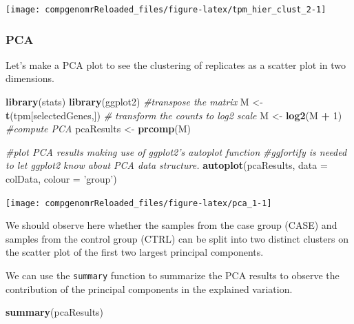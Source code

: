 \documentclass[12pt,]{krantz}
\newenvironment{Shaded}{\begin{snugshade}}{\end{snugshade}}
\newcommand{\CommentTok}[1]{\textcolor[rgb]{0.56,0.35,0.01}{\textit{#1}}}
\newcommand{\DataTypeTok}[1]{\textcolor[rgb]{0.13,0.29,0.53}{#1}}
\newcommand{\DecValTok}[1]{\textcolor[rgb]{0.00,0.00,0.81}{#1}}
\newcommand{\KeywordTok}[1]{\textcolor[rgb]{0.13,0.29,0.53}{\textbf{#1}}}
\newcommand{\NormalTok}[1]{#1}
\newcommand{\OperatorTok}[1]{\textcolor[rgb]{0.81,0.36,0.00}{\textbf{#1}}}
\newcommand{\StringTok}[1]{\textcolor[rgb]{0.31,0.60,0.02}{#1}}
\begin{document}
\begin{center}\texttt{[image: compgenomrReloaded\_files/figure-latex/tpm\_hier\_clust\_2-1]} \end{center}

\hypertarget{pca}{%
\subsubsection{PCA}\label{pca}}

Let's make a PCA plot to see the clustering of replicates as a scatter plot in two dimensions.

\begin{Shaded}
\begin{Highlighting}[]
\KeywordTok{library}\NormalTok{(stats)}
\KeywordTok{library}\NormalTok{(ggplot2)}
\CommentTok{#transpose the matrix }
\NormalTok{M <-}\StringTok{ }\KeywordTok{t}\NormalTok{(tpm[selectedGenes,])}
\CommentTok{# transform the counts to log2 scale }
\NormalTok{M <-}\StringTok{ }\KeywordTok{log2}\NormalTok{(M }\OperatorTok{+}\StringTok{ }\DecValTok{1}\NormalTok{)}
\CommentTok{#compute PCA }
\NormalTok{pcaResults <-}\StringTok{ }\KeywordTok{prcomp}\NormalTok{(M)}

\CommentTok{#plot PCA results making use of ggplot2's autoplot function}
\CommentTok{#ggfortify is needed to let ggplot2 know about PCA data structure. }
\KeywordTok{autoplot}\NormalTok{(pcaResults, }\DataTypeTok{data =}\NormalTok{ colData, }\DataTypeTok{colour =} \StringTok{'group'}\NormalTok{)}
\end{Highlighting}
\end{Shaded}

\begin{center}\texttt{[image: compgenomrReloaded\_files/figure-latex/pca\_1-1]} \end{center}

We should observe here whether the samples from the case group (CASE) and samples from the control group (CTRL) can be split into two distinct clusters on the scatter plot of the first two largest principal components.

We can use the \texttt{summary} function to summarize the PCA results to observe the contribution of the principal components in the explained variation.

\begin{Shaded}
\begin{Highlighting}[]
\KeywordTok{summary}\NormalTok{(pcaResults)}
\end{Highlighting}
\end{Shaded}
\end{document}
